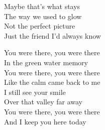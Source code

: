 \begin{lyrics}
Maybe that’s what stays\\
The way we used to glow\\
Not the perfect picture\\
Just the friend I’d always know

You were there, you were there\\
In the green water memory\\
You were there, you were there\\
Like the calm came back to me\\
I still see your smile\\
Over that valley far away\\
You were there, you were there\\
And I keep you here today
\end{lyrics}

